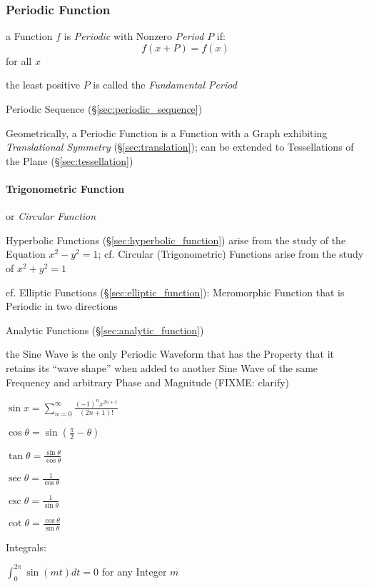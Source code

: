 \subsubsection{Periodic Function}\label{sec:periodic_function}

a Function $f$ is \emph{Periodic} with Nonzero \emph{Period} $P$ if:
\[
  f(x+P) = f(x)
\]
for all $x$

the least positive $P$ is called the \emph{Fundamental Period}

\fist Periodic Sequence (\S\ref{sec:periodic_sequence})

Geometrically, a Periodic Function is a Function with a Graph exhibiting
\emph{Translational Symmetry} (\S\ref{sec:translation});
can be extended to Tessellations of the Plane (\S\ref{sec:tessellation})



\paragraph{Trigonometric Function}\label{sec:trigonometric_function}\hfill

or \emph{Circular Function}

Hyperbolic Functions (\S\ref{sec:hyperbolic_function}) arise from the study of
the Equation $x^2 - y^2 = 1$; cf. Circular (Trigonometric) Functions arise from
the study of $x^2 + y^2 = 1$

cf. Elliptic Functions (\S\ref{sec:elliptic_function}): Meromorphic Function
that is Periodic in two directions

Analytic Functions (\S\ref{sec:analytic_function})


the Sine Wave is the only Periodic Waveform that has the Property that it
retains its ``wave shape'' when added to another Sine Wave of the same
Frequency and arbitrary Phase and Magnitude (FIXME: clarify)

$\sin x = \sum_{n=0}^\infty \frac{(-1)^n x^{2n+1}}{(2n + 1)!}$

$\cos\theta= \sin(\frac{\pi}{2} - \theta)$

$\tan\theta = \frac{\sin\theta}{\cos\theta}$

$\sec\theta = \frac{1}{\cos\theta}$

$\csc\theta = \frac{1}{\sin\theta}$

$\cot\theta = \frac{\cos\theta}{\sin\theta}$

Integrals:

$\int_0^{2\pi} \sin(mt)dt = 0$ for any Integer $m$

